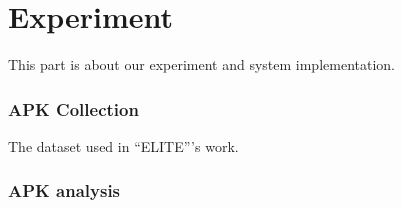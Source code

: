 
\part{Experiment}

This part is about our experiment and system implementation.


\section{APK Collection}

The dataset used in ``ELITE'''s work.

\section{APK analysis}








